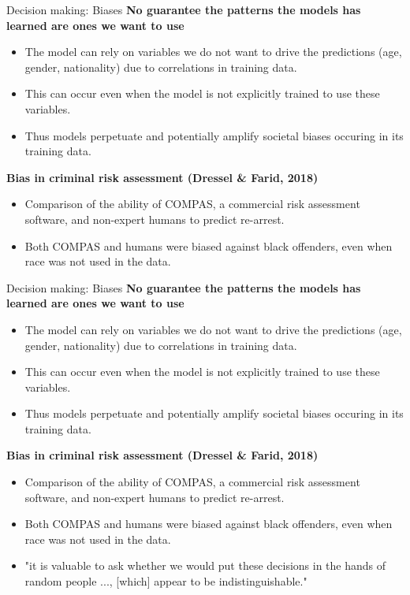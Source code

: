 \documentclass[8pt]{beamer}
\begin{document}
	\begin{frame}[t]{Decision making: Biases} %
		\textbf{No guarantee the patterns the models has learned are ones we want to use}
		\begin{itemize}
			\item The model can rely on variables we do not want to drive the predictions (age, gender, nationality) due to correlations in training data.
			\item This can occur even when the model is not explicitly trained to use these variables.
			\item Thus models perpetuate and potentially amplify societal biases occuring in its training data.
		\end{itemize}
		\textbf{Bias in criminal risk assessment (Dressel \& Farid, 2018)}
		\begin{itemize}
			\item Comparison of the ability of COMPAS, a commercial risk assessment software, and non-expert humans to predict re-arrest.
			\item Both COMPAS and humans were biased against black offenders, even when race was not used in the data.
		\end{itemize}
	\end{frame}

	\begin{frame}[t]{Decision making: Biases} %
		\textbf{No guarantee the patterns the models has learned are ones we want to use}
		\begin{itemize}
			\item The model can rely on variables we do not want to drive the predictions (age, gender, nationality) due to correlations in training data.
			\item This can occur even when the model is not explicitly trained to use these variables.
			\item Thus models perpetuate and potentially amplify societal biases occuring in its training data.
		\end{itemize}
		\textbf{Bias in criminal risk assessment (Dressel \& Farid, 2018)}
		\begin{itemize}
			\item Comparison of the ability of COMPAS, a commercial risk assessment software, and non-expert humans to predict re-arrest.
			\item Both COMPAS and humans were biased against black offenders, even when race was not used in the data.
			\item "it is valuable to ask whether we would put these decisions in the hands of random people ..., [which] appear to be indistinguishable."
		\end{itemize}
	\end{frame}
\end{document}
